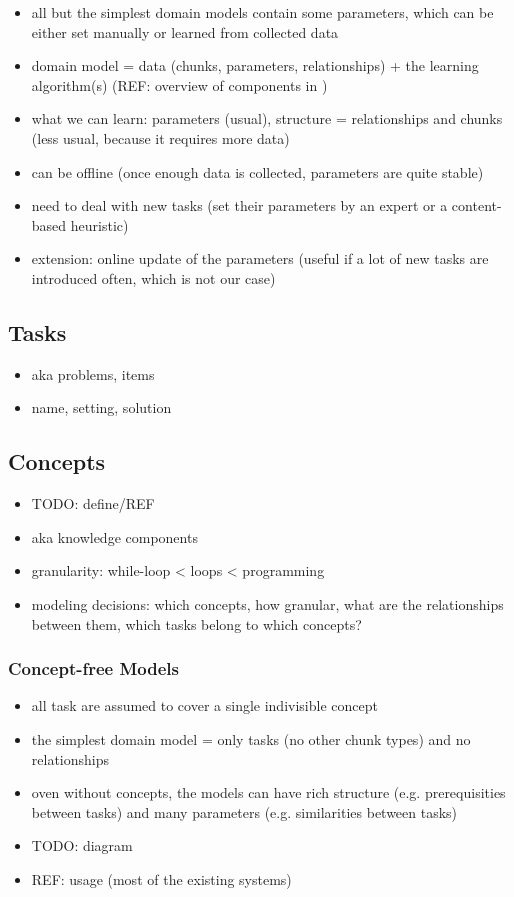 \begin{itemize}
\item all but the simplest domain models contain some parameters,
  which can be either set manually or learned from collected data
\item domain model = data (chunks, parameters, relationships) + the learning algorithm(s)
  (REF: overview of components in \cite{pelanek-learner-modeling})
\item what we can learn: parameters (usual), structure = relationships and
  chunks (less usual, because it requires more data)
\item can be offline (once enough data is collected, parameters are quite stable)
\item need to deal with new tasks (set their parameters by an expert or a content-based heuristic)
\item extension: online update of the parameters (useful if a lot of new tasks
  are introduced often, which is not our case)
\end{itemize}


\subsection{Tasks}

\begin{itemize}
\item aka problems, items
\item name, setting, solution
\end{itemize}

\subsection{Concepts}

\begin{itemize}
\item TODO: define/REF
\item aka knowledge components
\item granularity: while-loop < loops < programming
\item modeling decisions: which concepts, how granular, what are the
  relationships between them, which tasks belong to which concepts?
\end{itemize}

\subsubsection{\textbf{Concept-free Models}}
\begin{itemize}
\item all task are assumed to cover a single indivisible concept
\item the simplest domain model = only tasks (no other chunk types) and no relationships
\item oven without concepts, the models can have
  rich structure (e.g. prerequisities between tasks)
  and many parameters (e.g. similarities between tasks)
\item TODO: diagram
\item REF: usage (most of the existing systems)
\end{itemize}

